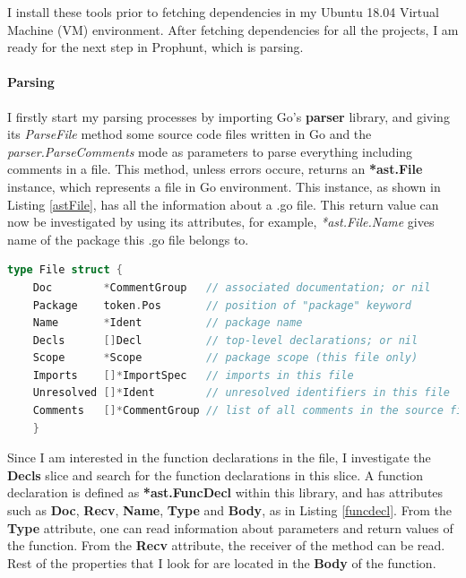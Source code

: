 \documentclass{seal_thesis}
\begin{document}
\noindent I install these tools prior to fetching dependencies in my Ubuntu 18.04 Virtual Machine (VM) environment. After fetching dependencies for all the projects, I am ready for the next step in Prophunt, which is parsing.

\paragraph{Parsing}

I firstly start my parsing processes by importing Go's \textbf{parser} library, and giving its \textit{ParseFile} method some source code files written in Go and the \textit{parser.ParseComments} mode as parameters to parse everything including comments in a file. This method, unless errors occure, returns an \textbf{*ast.File} instance, which represents a file in Go environment. This instance, as shown in Listing \ref{astFile}, has all the information about a .go file. This return value can now be investigated by using its attributes, for example, \textit{*ast.File.Name} gives name of the package this .go file belongs to.

\begin{lstlisting}[caption=*ast.File declaration in Go., label={astFile}, language=Go, frame=single]
	type File struct {
	Doc        *CommentGroup   // associated documentation; or nil
	Package    token.Pos       // position of "package" keyword
	Name       *Ident          // package name
	Decls      []Decl          // top-level declarations; or nil
	Scope      *Scope          // package scope (this file only)
	Imports    []*ImportSpec   // imports in this file
	Unresolved []*Ident        // unresolved identifiers in this file
	Comments   []*CommentGroup // list of all comments in the source file
	}
\end{lstlisting}

\noindent Since I am interested in the function declarations in the file, I investigate the \textbf{Decls} slice and search for the function declarations in this slice. A function declaration is defined as \textbf{*ast.FuncDecl} within this library, and has attributes such as \textbf{Doc}, \textbf{Recv}, \textbf{Name}, \textbf{Type} and \textbf{Body}, as in Listing \ref{funcdecl}. From the \textbf{Type} attribute, one can read information about parameters and return values of the function. From the \textbf{Recv} attribute, the receiver of the method can be read. Rest of the properties that I look for are located in the \textbf{Body} of the function.
\end{document}

